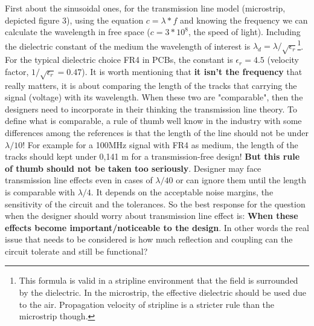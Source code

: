 \documentclass[final]{cubedoc}
\begin{document}
	
	First about the sinusoidal ones, for the transmission line model (microstrip, depicted figure 3), using the equation $ c = \lambda*f$ and knowing the frequency we can calculate the wavelength in free space ($c = 3*10^8$, the speed of light). Including the dielectric constant of the medium the wavelength of interest is $\lambda_d = \lambda/\sqrt{\epsilon_r}$\footnote{This formula is valid in a stripline environment that the field is surrounded by the dielectric. In the microstrip, the effective dielectric should be used due to the air. Propagation velocity of stripline is a stricter rule than the microstrip though.}. For the typical dielectric choice FR4 in PCBs, the constant is $\epsilon_r = 4.5$ (velocity factor, $1/\sqrt{\epsilon_r} = 0.47$).
	It is worth mentioning that \textbf{it isn't the frequency} that really matters, it is about comparing the length of the tracks that carrying the signal (voltage) with its wavelength. When these two are "comparable", then the designers need to incorporate in their thinking the transmission line theory. To define what is comparable, a rule of thumb well know in the industry with some differences among the references is that the length of the line should not be under $\lambda/10$! For example for a 100MHz signal with FR4 as medium, the length of the tracks should kept under 0,141 m for a transmission-free design! \textbf{But this rule of thumb should not be taken too seriously}. Designer may face transmission line effects even in cases of $\lambda/40$ or can ignore them until the length is comparable with $\lambda/4$. It depends on the acceptable noise margins, the sensitivity of the circuit and the tolerances. So the best response for the question when the designer should worry about transmission line effect is: \textbf{When these effects become important/noticeable to the design}. In other words the real issue that needs to be considered is how much reflection and coupling can the circuit tolerate and still be functional? 
\end{document}
